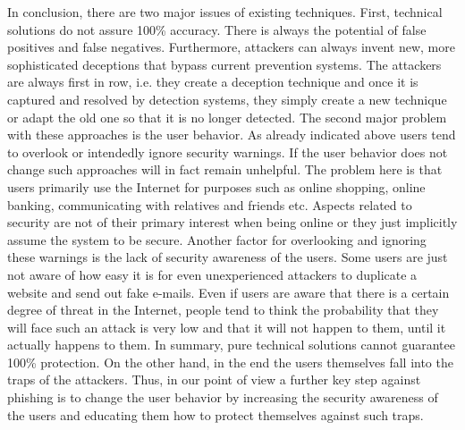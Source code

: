 In conclusion, there are two major issues of existing techniques. First, technical solutions do not assure 100\% accuracy. There is always the potential of false positives and false negatives. Furthermore, attackers can always invent new, more sophisticated deceptions that bypass current prevention systems. The attackers are always first in row, i.e. they create a deception technique and once it is captured and resolved by detection systems, they simply create a new technique or adapt the old one so that it is no longer detected. The second major problem with these approaches is the user behavior. As already indicated above users tend to overlook or intendedly ignore security warnings. If the user behavior does not change such approaches will in fact remain unhelpful. The problem here is that users primarily use the Internet for purposes such as online shopping, online banking, communicating with relatives and friends etc. Aspects related to  security are not of their primary interest when being online or they just implicitly assume the system to be secure. Another factor for overlooking and ignoring these warnings is the lack of security awareness of the users. Some users are just not aware of how easy it is for even unexperienced attackers to duplicate a website and send out fake e-mails. Even if users are aware that there is a certain degree of threat in the Internet, people tend to think the probability that they will face such an attack is very low and that it will not happen to them, until it actually happens to them. In summary, pure technical solutions cannot guarantee 100\% protection. On the other hand, in the end the users themselves fall into the traps of the attackers. Thus, in our point of view a further key step against phishing is to change the user behavior by increasing the security awareness of the users and educating them how to protect themselves against such traps.


